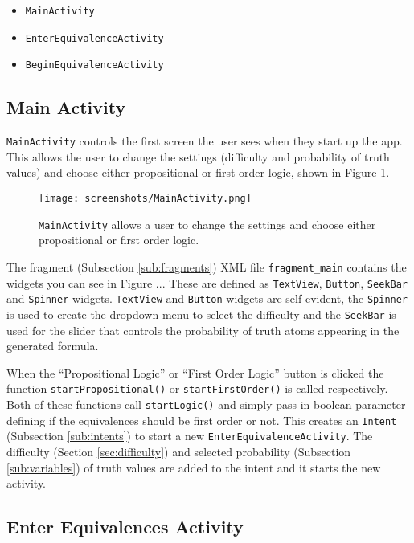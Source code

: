 \documentclass[draft]{report}
\begin{document}
\begin{itemize}
\item {\tt MainActivity}
\item {\tt EnterEquivalenceActivity}
\item {\tt BeginEquivalenceActivity}
\end{itemize}

\subsection{Main Activity}

{\tt MainActivity} controls the first screen the user sees when they start up the app. This allows the user to change the settings (difficulty and probability of truth values) and choose either propositional or first order logic, shown in Figure \ref{mainactivity}.

\begin{figure}[ht!]
    \centering
    \texttt{[image: screenshots/MainActivity.png]}
    \caption{{\tt MainActivity} allows a user to change the settings and choose either propositional or first order logic.}
    \label{mainactivity}
\end{figure}

The fragment (Subsection \ref{sub:fragments}) XML file {\tt fragment\_main} contains the widgets you can see in Figure ... These are defined as {\tt TextView}, {\tt Button}, {\tt SeekBar} and {\tt Spinner} widgets. {\tt TextView} and {\tt Button} widgets are self-evident, the {\tt Spinner} is used to create the dropdown menu to select the difficulty and the {\tt SeekBar} is used for the slider that controls the probability of truth atoms appearing in the generated formula.

When the ``Propositional Logic'' or ``First Order Logic'' button is clicked the function {\tt startPropositional()} or {\tt startFirstOrder()} is called respectively. Both of these functions call {\tt startLogic()} and simply pass in boolean parameter defining if the equivalences should be first order or not. This creates an {\tt Intent} (Subsection \ref{sub:intents}) to start a new {\tt EnterEquivalenceActivity}. The difficulty (Section \ref{sec:difficulty}) and selected probability (Subsection \ref{sub:variables}) of truth values are added to the intent and it starts the new activity.

\subsection{Enter Equivalences Activity}
\end{document}

